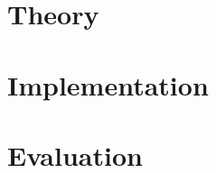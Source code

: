 \documentclass[
paper=a4,
fontsize = 12pt, %
headsepline,     %
titlepage,       %
numbers=noenddot,
headings=optiontohead, %
]{scrbook}
\begin{document}
\frontmatter
{}
\cofoot[\pagemark]{}
\rofoot[]{}



\tableofcontents
\listoffigures
\listoftables


\printnomenclature

\mainmatter
{}

\rofoot[]{\pagemark}


%


\part{Theory}\label{part:theory}














\part{Implementation}\label{part:implementation}





\part{Evaluation}\label{part:evaluation}
\end{document}
